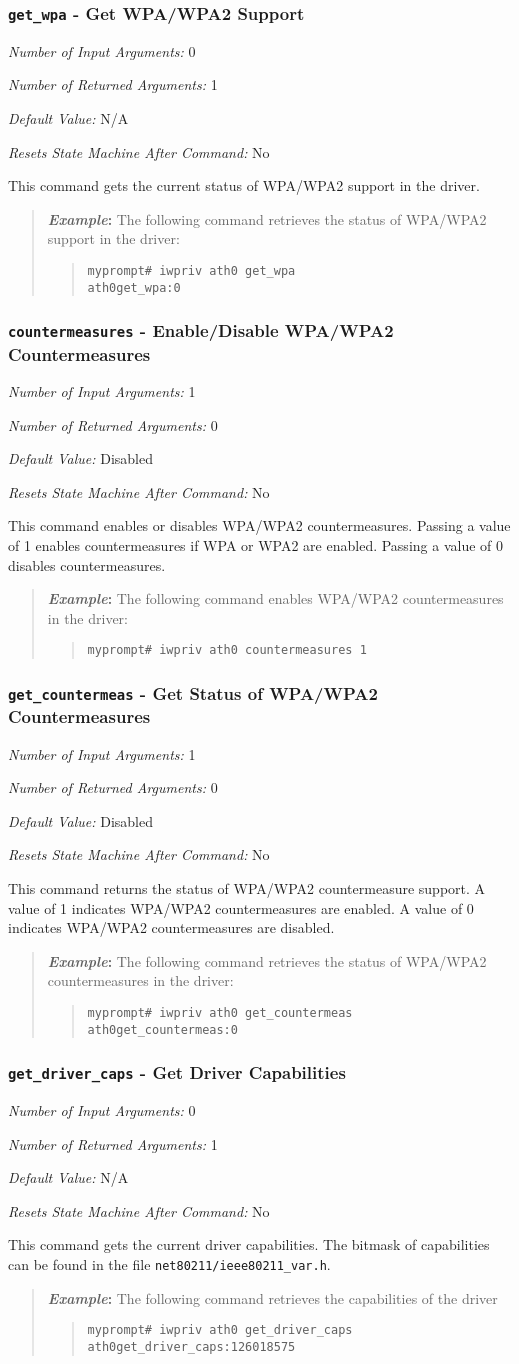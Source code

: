 \documentclass[10pt,fullpage]{article}
\newcommand{\mytt}[1]{{\texttt{#1}}}
\newcommand{\bv}{\begin{verse}}
\newcommand{\ev}{\end{verse}}
\newcommand{\cmd}[1]{{\texttt{myprompt\# #1}}}
\newcommand{\argdesc}[4]{\begin{description}
\itemsep -6pt
\item \textit{Number of Input Arguments:} #1
\item \textit{Number of Returned Arguments:} #2
\item \textit{Default Value:} #3
\item \textit{Resets State Machine After Command:} #4
\end{description}
}
\newenvironment{example}{\begin{quote}\textbf{\textit{Example}:}}{\end{quote}}
\begin{document}
\subsubsection{\mytt{get\_wpa} - Get WPA/WPA2 Support}
\argdesc{0}{1}{N/A}{No}
This command gets the current status of WPA/WPA2 support in the driver.
\begin{example}
  The following command retrieves the status of WPA/WPA2 support in
  the driver:
  \bv
  \cmd{iwpriv ath0 get\_wpa}\\
  \mytt{ath0\hspace{32pt}get\_wpa:0}
  \ev
\end{example}

\subsubsection{\mytt{countermeasures} - Enable/Disable WPA/WPA2 Countermeasures}
\argdesc{1}{0}{Disabled}{No}
This command enables or disables WPA/WPA2 countermeasures.  Passing a
value of 1 enables countermeasures if WPA or WPA2 are enabled.
Passing a value of 0 disables countermeasures.
\begin{example}
  The following command enables WPA/WPA2 countermeasures in the driver:
  \bv
  \cmd{iwpriv ath0 countermeasures 1}
  \ev
\end{example}

\subsubsection{\mytt{get\_countermeas} - Get Status of WPA/WPA2 Countermeasures}
\argdesc{1}{0}{Disabled}{No}
This command returns the status of WPA/WPA2 countermeasure support.
A value of 1 indicates WPA/WPA2 countermeasures are enabled.
A value of 0 indicates WPA/WPA2 countermeasures are disabled.
\begin{example}
  The following command retrieves the status of WPA/WPA2
  countermeasures in the driver:
  \bv
  \cmd{iwpriv ath0 get\_countermeas}\\
  \mytt{ath0\hspace{32pt}get\_countermeas:0}
  \ev
\end{example}

\subsubsection{\mytt{get\_driver\_caps} - Get Driver Capabilities}
\argdesc{0}{1}{N/A}{No}
This command gets the current driver capabilities.  The bitmask of
capabilities can be found in the file \mytt{net80211/ieee80211\_var.h}.
\begin{example}
  The following command retrieves the capabilities of the driver
  \bv
  \cmd{iwpriv ath0 get\_driver\_caps}\\
  \mytt{ath0\hspace{32pt}get\_driver\_caps:126018575}
\ev
\end{example}
\end{document}
